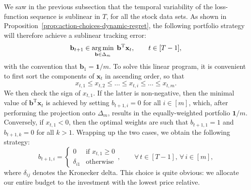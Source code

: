 We saw in the previous subsection that the temporal variability of the loss-function sequence is sublinear in $T$, for all the stock data sets. As shown in Proposition~\ref{prop:action-choices-dynamic-regret}, the following portfolio strategy will therefore achieve a sublinear tracking error:
\begin{equation}
\label{eq:single-olmax-criterion}
	\mathbf{b}_{t+1} \in \operatorname*{arg\,min}_{\mathbf{b}\in\Delta_m}\; \mathbf{b}^\text{T}\mathbf{x}_t, \qquad t \in [T-1],
\end{equation}
with the convention that $\mathbf{b}_1 = \mathbf{1} / m$. To solve this linear program, it is convenient to first sort the components of $\mathbf{x}_t$ in ascending order, so that
\begin{equation}
	x_{t,1} \leq x_{t,2} \leq \ldots \leq x_{t,i} \leq \ldots \leq x_{t,m}.
\end{equation}
We then check the sign of $x_{t,1}$. If the latter is non-negative, then the minimal value of $\mathbf{b}^\text{T}\mathbf{x}_t$ is achieved by setting $b_{t+1,i} = 0$ for all $i\in[m]$, which, after performing the projection onto $\Delta_m$, results in the equally-weighted portfolio $\mathbf{1} / m$. Conversely, if $x_{t,1} < 0$, then the optimal weights are such that $b_{t+1,1} = 1$ and $b_{t+1,k} = 0$ for all $k > 1$. Wrapping up the two cases, we obtain the following strategy:
\begin{equation}
	b_{t+1,i} =
	\begin{cases}
		0 & \text{if } x_{t,1} \geq 0 \\
		\delta_{i1} & \text{otherwise}
	\end{cases},
	\qquad \forall\,t \in [T-1],\, \forall\,i \in [m],
\end{equation}
where $\delta_{ij}$ denotes the Kronecker delta. This choice is quite obvious: we allocate our entire budget to the investment with the lowest price relative.

